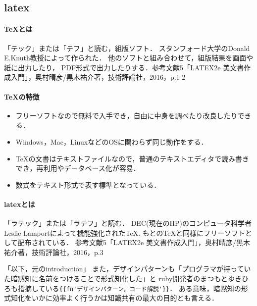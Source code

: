 \subsection{latex}

\paragraph{TeXとは}
\begin{description}
\item 「テック」または「テフ」と読む，組版ソフト．
スタンフォード大学のDonald E.Knuth教授によって作られた．
他のソフトと組み合わせて，組版結果を画面や紙に出力したり，
PDF形式で出力したりする．参考文献5「LATEX2e 美文書作成入門」，奥村晴彦/黒木祐介著，技術評論社，2016，p.1-2
\end{description}

\paragraph{TeXの特徴}
\begin{itemize}
\item フリーソフトなので無料で入手でき，自由に中身を調べたり改良したりできる．
\item Windows，Mac，LinuxなどのOSに関わらず同じ動作をする．
\item TeXの文書はテキストファイルなので，普通のテキストエディタで読み書きでき，再利用やデータベース化が容易．
\item 数式をテキスト形式で表す標準となっている．
\end{itemize}

\paragraph{latexとは}
\begin{description}
\item 「ラテック」または「ラテフ」と読む．
DEC(現在のHP)のコンピュータ科学者Leslie Lamportによって機能強化されたTeX.
もとのTeXと同様にフリーソフトとして配布されている．
参考文献5「LATEX2e 美文書作成入門」，奥村晴彦/黒木祐介著，技術評論社，2016，p.3
\end{description}


「以下，元のintroduction」
また，デザインパターンも「プログラマが持っていた暗黙知に名前をつけることで形式知化した」と
ruby開発者のまつもとゆきひろも指摘している\verb|{{fn'デザインパターン，コード解説'}}|．
ある意味，暗黙知の形式知化をいかに効率よく行うかは知識共有の最大の目的とも言える．

